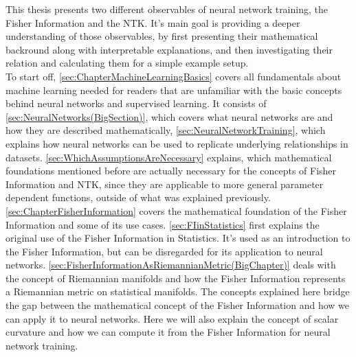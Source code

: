 This thesis presents two different observables of neural network training, the Fisher Information and the NTK. It's main goal is providing a deeper understanding of those observables, by first presenting their mathematical backround along with interpretable explanations, and then investigating their relation and calculating them for a simple example setup.\\
To start off, \cref{sec:ChapterMachineLearningBasics} covers all fundamentals about machine learning needed for readers that are unfamiliar with the basic concepts behind neural networks and supervised learning. It consists of \cref{sec:NeuralNetworks(BigSection)}, which covers what neural networks are and how they are described mathematically, \cref{sec:NeuralNetworkTraining}, which explains how neural networks can be used to replicate underlying relationships in datasets. \cref{sec:WhichAssumptionsAreNecessary} explains, which mathematical foundations mentioned before are actually necessary for the concepts of Fisher Information and NTK, since they are applicable to more general parameter dependent functions, outside of what was explained previously.\\
\cref{sec:ChapterFisherInformation} covers the mathematical foundation of the Fisher Information and some of its use cases. \cref{sec:FIinStatistics} first explains the original use of the Fisher Information in Statistics. It's used as an introduction to the Fisher Information, but can be disregarded for its application to neural networks. \cref{sec:FisherInformationAsRiemannianMetric(BigChapter)} deals with the concept of Riemannian manifolds and how the Fisher Information represents a Riemannian metric on statistical manifolds. The concepts explained here bridge the gap between the mathematical concept of the Fisher Information and how we can apply it to neural networks. Here we will also explain the concept of scalar curvature and how we can compute it from the Fisher Information for neural network training. %
